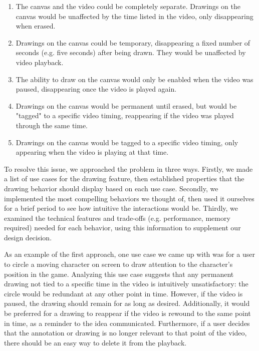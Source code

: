 \documentclass[conference]{IEEEtran}
\begin{document}
  \begin{enumerate}
    \item The canvas and the video could be completely separate. Drawings on the canvas would be unaffected by the time listed in the video, only disappearing when erased.

    \item Drawings on the canvas could be temporary, disappearing a fixed number of seconds (e.g. five seconds) after being drawn. They would be unaffected by video playback.

    \item The ability to draw on the canvas would only be enabled when the video was paused, disappearing once the video is played again.

    \item Drawings on the canvas would be permanent until erased, but would be "tagged" to a specific video timing, reappearing if the video was played through the same time.

    \item Drawings on the canvas would be tagged to a specific video timing, only appearing when the video is playing at that time.
  \end{enumerate}

  To resolve this issue, we approached the problem in three ways. Firstly, we made a list of use cases for the drawing feature, then established properties that the drawing behavior should display based on each use case. Secondly, we implemented the most compelling behaviors we thought of, then used it ourselves for a brief period to see how intuitive the interactions would be. Thirdly, we examined the technical features and trade-offs (e.g. performance, memory required) needed for each behavior, using this information to supplement our design decision.

  As an example of the first approach, one use case we came up with was for a user to circle a moving character on screen to draw attention to the character's position in the game. Analyzing this use case suggests that any permanent drawing not tied to a specific time in the video is intuitively unsatisfactory: the circle would be redundant at any other point in time. However, if the video is paused, the drawing should remain for as long as desired. Additionally, it would be preferred for a drawing to reappear if the video is rewound to the same point in time, as a reminder to the idea communicated. Furthermore, if a user decides that the annotation or drawing is no longer relevant to that point of the video, there should be an easy way to delete it from the playback.
\end{document}
